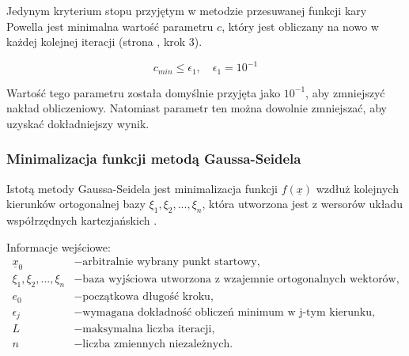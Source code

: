 \documentclass[a4paper,12pt]{article}
\begin{document}
Jedynym kryterium stopu przyjętym w metodzie przesuwanej funkcji kary Powella jest minimalna wartość parametru $c$, który jest obliczany na nowo w każdej kolejnej iteracji (strona \pageref{uml_powell}, krok 3).

\begin{equation} \label{eq:5}
    c_{min} \leq \epsilon_{1}, \quad \epsilon_{1} = 10^{-1}
\end{equation}

Wartość tego parametru została domyślnie przyjęta jako $10^{-1}$, aby zmniejszyć nakład obliczeniowy. Natomiast parametr ten można dowolnie zmniejszać, aby uzyskać dokładniejszy wynik.

\subsubsection{Minimalizacja funkcji metodą Gaussa-Seidela}
Istotą metody Gaussa-Seidela jest minimalizacja funkcji $f(\underline{x})$ wzdłuż kolejnych kierunków ortogonalnej bazy $\xi_{1}, \xi_{2}, ... , \xi_{n}$, która utworzona jest z wersorów układu współrzędnych kartezjańskich \cite{bibitem1}\cite{bibitem3}. \newline

Informacje wejściowe:
\begin{align*}
    \underline{x}_{0} &- \mbox{arbitralnie wybrany punkt startowy,} \\
    \xi_{1}, \xi_{2}, ... , \xi_{n} &- \mbox{baza wyjściowa utworzona z wzajemnie ortogonalnych wektorów,} \\
    e_{0} &- \mbox{początkowa długość kroku,} \\
    \epsilon_{j} &- \mbox{wymagana dokładność obliczeń minimum w j-tym kierunku,} \\
    L &- \mbox{maksymalna liczba iteracji,} \\
    n &- \mbox{liczba zmiennych niezależnych.}
\end{align*}
\end{document}
